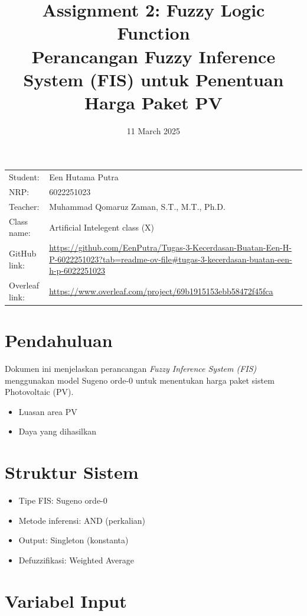 \documentclass{article}
\title{Assignment 2: Fuzzy Logic Function\\ Perancangan Fuzzy Inference System (FIS) untuk Penentuan Harga Paket PV
}
\date{11 March 2025}
\begin{document}
\maketitle


\noindent\begin{tabular}{@{}ll}
    Student: & Een Hutama Putra\\
    NRP: & 6022251023\\
     Teacher: &  Muhammad Qomaruz Zaman, S.T., M.T., Ph.D.\\
     Class name: & Artificial Intelegent class (X)\\
     GitHub link: & \url{https://github.com/EenPutra/Tugas-3-Kecerdasan-Buatan-Een-H-P-6022251023?tab=readme-ov-file#tugas-3-kecerdasan-buatan-een-h-p-6022251023}\\
     Overleaf link: & \url{https://www.overleaf.com/project/69b1915153ebb58472f45fca}\\
\end{tabular}
\vspace{0,5cm}


\section{Pendahuluan}
Dokumen ini menjelaskan perancangan \textit{Fuzzy Inference System (FIS)} menggunakan model Sugeno orde-0 untuk menentukan harga paket sistem Photovoltaic (PV).
\begin{itemize}
    \item Luasan area PV
    \item Daya yang dihasilkan
\end{itemize}

\section{Struktur Sistem}
\begin{itemize}
    \item Tipe FIS: Sugeno orde-0
    \item Metode inferensi: AND (perkalian)
    \item Output: Singleton (konstanta)
    \item Defuzzifikasi: Weighted Average
\end{itemize}

\section{Variabel Input}
\end{document}
